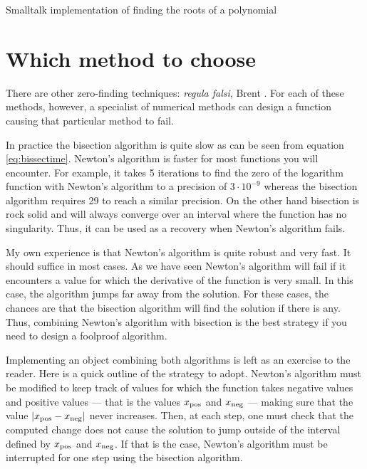 \documentclass[twoside]{book}
\begin{document}
\begin{listing} Smalltalk implementation of finding the roots of a polynomial \label{ls:polroots}

\end{listing}

\section{Which method to choose}
There are other zero-finding techniques: {\it regula falsi}, Brent
\cite{Press}. For each of these methods, however, a specialist of
numerical methods can design a function causing that particular
method to fail.

In practice the bisection algorithm is quite slow as can be seen
from equation \ref{eq:bissectime}. Newton's algorithm is faster
for most functions you will encounter. For example, it takes 5
iterations to find the zero of the logarithm function with
Newton's algorithm to a precision of $3\cdot 10^{-9}$ whereas the
bisection algorithm requires 29 to reach a similar precision. On
the other hand bisection is rock solid and will always converge
over an interval where the function has no singularity. Thus, it
can be used as a recovery when Newton's algorithm fails.

My own experience is that Newton's algorithm is quite robust and
very fast. It should suffice in most cases. As we have seen
Newton's algorithm will fail if it encounters a value for which
the derivative of the function is very small. In this case, the
algorithm jumps far away from the solution. For these cases, the
chances are that the bisection algorithm will find the solution if
there is any. Thus, combining Newton's algorithm with bisection is
the best strategy if you need to design a foolproof algorithm.

Implementing an object combining both algorithms is left as an
exercise to the reader. Here is a quick outline of the strategy to
adopt. Newton's algorithm must be modified to keep track of values
for which the function takes negative values and positive values
--- that is the values $x_{\mathop{\rm pos}}$ and $x_{\mathop{\rm neg}}$
--- making sure that the value $\left| x_{\mathop{\rm pos}}-x_{\mathop{\rm neg}}\right|$
never increases. Then, at each step, one must check that the
computed change does not cause the solution to jump outside of the
interval defined by $x_{\mathop{\rm pos}}$ and $x_{\mathop{\rm
neg}}$. If that is the case, Newton's algorithm must be
interrupted for one step using the bisection algorithm.

\ifx\wholebook\relax\else
\end{document}
